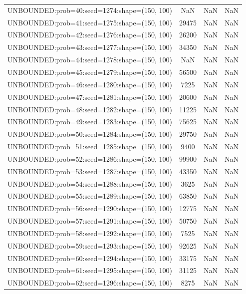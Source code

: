 \begin{longtable}{lccc}
UNBOUNDED:prob=40:seed=1274:shape=(150, 100)  &   NaN &   NaN &    NaN \\
UNBOUNDED:prob=41:seed=1275:shape=(150, 100)  & 29475 &   NaN &    NaN \\
UNBOUNDED:prob=42:seed=1276:shape=(150, 100)  & 26200 &   NaN &    NaN \\
UNBOUNDED:prob=43:seed=1277:shape=(150, 100)  & 34350 &   NaN &    NaN \\
UNBOUNDED:prob=44:seed=1278:shape=(150, 100)  &   NaN &   NaN &    NaN \\
UNBOUNDED:prob=45:seed=1279:shape=(150, 100)  & 56500 &   NaN &    NaN \\
UNBOUNDED:prob=46:seed=1280:shape=(150, 100)  &  7225 &   NaN &    NaN \\
UNBOUNDED:prob=47:seed=1281:shape=(150, 100)  & 20600 &   NaN &    NaN \\
UNBOUNDED:prob=48:seed=1282:shape=(150, 100)  & 11225 &   NaN &    NaN \\
UNBOUNDED:prob=49:seed=1283:shape=(150, 100)  & 75625 &   NaN &    NaN \\
UNBOUNDED:prob=50:seed=1284:shape=(150, 100)  & 29750 &   NaN &    NaN \\
UNBOUNDED:prob=51:seed=1285:shape=(150, 100)  &  9400 &   NaN &    NaN \\
UNBOUNDED:prob=52:seed=1286:shape=(150, 100)  & 99900 &   NaN &    NaN \\
UNBOUNDED:prob=53:seed=1287:shape=(150, 100)  & 43350 &   NaN &    NaN \\
UNBOUNDED:prob=54:seed=1288:shape=(150, 100)  &  3625 &   NaN &    NaN \\
UNBOUNDED:prob=55:seed=1289:shape=(150, 100)  & 63850 &   NaN &    NaN \\
UNBOUNDED:prob=56:seed=1290:shape=(150, 100)  & 12775 &   NaN &    NaN \\
UNBOUNDED:prob=57:seed=1291:shape=(150, 100)  & 50750 &   NaN &    NaN \\
UNBOUNDED:prob=58:seed=1292:shape=(150, 100)  &  7525 &   NaN &    NaN \\
UNBOUNDED:prob=59:seed=1293:shape=(150, 100)  & 92625 &   NaN &    NaN \\
UNBOUNDED:prob=60:seed=1294:shape=(150, 100)  & 33175 &   NaN &    NaN \\
UNBOUNDED:prob=61:seed=1295:shape=(150, 100)  & 31125 &   NaN &    NaN \\
UNBOUNDED:prob=62:seed=1296:shape=(150, 100)  &  8275 &   NaN &    NaN \\

\end{longtable}
